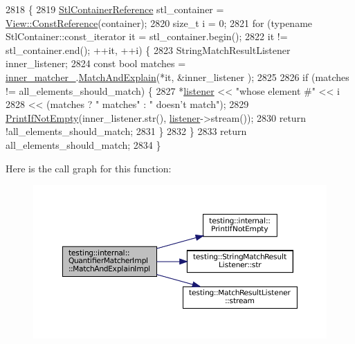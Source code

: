 \begin{DoxyCode}
2818                                                                 \{
2819     \hyperlink{classtesting_1_1internal_1_1QuantifierMatcherImpl_a341dd7815b3c6090d935026daac6e938}{StlContainerReference} stl\_container = 
      \hyperlink{classtesting_1_1internal_1_1StlContainerView_a36eccf53329730f6e55c12002128bf25}{View::ConstReference}(container);
2820     \textcolor{keywordtype}{size\_t} i = 0;
2821     \textcolor{keywordflow}{for} (\textcolor{keyword}{typename} StlContainer::const\_iterator it = stl\_container.begin();
2822          it != stl\_container.end(); ++it, ++i) \{
2823       StringMatchResultListener inner\_listener;
2824       \textcolor{keyword}{const} \textcolor{keywordtype}{bool} matches = \hyperlink{classtesting_1_1internal_1_1QuantifierMatcherImpl_af0ee2a4697f5cb8e937fd29dd75e2a30}{inner\_matcher\_}.\hyperlink{classtesting_1_1internal_1_1MatcherBase_a08429a6d7e7d330de4a4eb4e272105a7}{MatchAndExplain}(*it, &inner\_listener
      );
2825 
2826       \textcolor{keywordflow}{if} (matches != all\_elements\_should\_match) \{
2827         *\hyperlink{namespaceinteractive__marker_a0e579ab555212bb5e2c9f8a675b7618a}{listener} << \textcolor{stringliteral}{"whose element #"} << i
2828                   << (matches ? \textcolor{stringliteral}{" matches"} : \textcolor{stringliteral}{" doesn't match"});
2829         \hyperlink{namespacetesting_1_1internal_afa4cd5d7933878d6d820b32c87bb2767}{PrintIfNotEmpty}(inner\_listener.str(), \hyperlink{namespaceinteractive__marker_a0e579ab555212bb5e2c9f8a675b7618a}{listener}->stream());
2830         \textcolor{keywordflow}{return} !all\_elements\_should\_match;
2831       \}
2832     \}
2833     \textcolor{keywordflow}{return} all\_elements\_should\_match;
2834   \}
\end{DoxyCode}
Here is the call graph for this function\+:
\nopagebreak
\begin{figure}[H]
\begin{center}
\leavevmode
\includegraphics[width=350pt]{classtesting_1_1internal_1_1QuantifierMatcherImpl_ab8f64532b70f47fc60f7983ebe5cbfc6_cgraph}
\end{center}
\end{figure}


